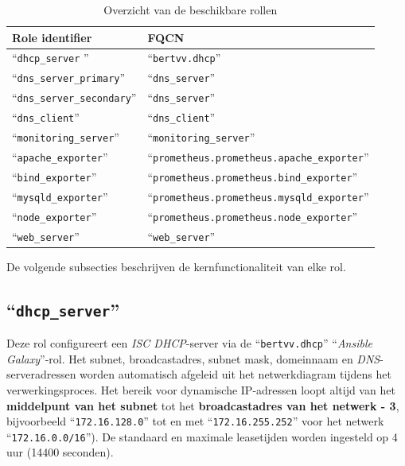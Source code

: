 \begin{table}[H]
  \centering
  \begin{tabularx}{\textwidth}{l X}
    \toprule
    \textbf{Role identifier}            & \textbf{FQCN}                                       \\
    \midrule
    ``\texttt{dhcp\_server} ''          & ``\texttt{bertvv.dhcp}''                            \\
    ``\texttt{dns\_server\_primary}''   & ``\texttt{dns\_server}''                            \\
    ``\texttt{dns\_server\_secondary}'' & ``\texttt{dns\_server}''                            \\
    ``\texttt{dns\_client}''            & ``\texttt{dns\_client}''                            \\
    ``\texttt{monitoring\_server}''     & ``\texttt{monitoring\_server}''                     \\
    ``\texttt{apache\_exporter}''       & ``\texttt{prometheus.prometheus.apache\_exporter}'' \\
    ``\texttt{bind\_exporter}''         & ``\texttt{prometheus.prometheus.bind\_exporter}''   \\
    ``\texttt{mysqld\_exporter}''       & ``\texttt{prometheus.prometheus.mysqld\_exporter}'' \\
    ``\texttt{node\_exporter}''         & ``\texttt{prometheus.prometheus.node\_exporter}''   \\
    ``\texttt{web\_server}''            & ``\texttt{web\_server}''                            \\
    \bottomrule
  \end{tabularx}
  \caption[Beschikbare rollen]{Overzicht van de beschikbare rollen}
  \label{tab:beschikbare_rollen}
\end{table}

De volgende subsecties beschrijven de kernfunctionaliteit van elke rol.

\subsection{``\texttt{dhcp\_server}''}%
\label{subsec:rol_dhcp_server}

Deze rol configureert een \emph{ISC DHCP}-server via de ``\texttt{bertvv.dhcp}'' ``\emph{Ansible Galaxy}''-rol. Het subnet, broadcastadres, subnet mask, domeinnaam en \emph{DNS}-serveradressen worden automatisch afgeleid uit het netwerkdiagram tijdens het verwerkingsproces. Het bereik voor dynamische IP-adressen loopt altijd van het \textbf{middelpunt van het subnet} tot het \textbf{broadcastadres van het netwerk - 3}, bijvoorbeeld ``\texttt{172.16.128.0}'' tot en met ``\texttt{172.16.255.252}'' voor het netwerk ``\texttt{172.16.0.0/16}''). De standaard en maximale leasetijden worden ingesteld op 4 uur (14400 seconden).


